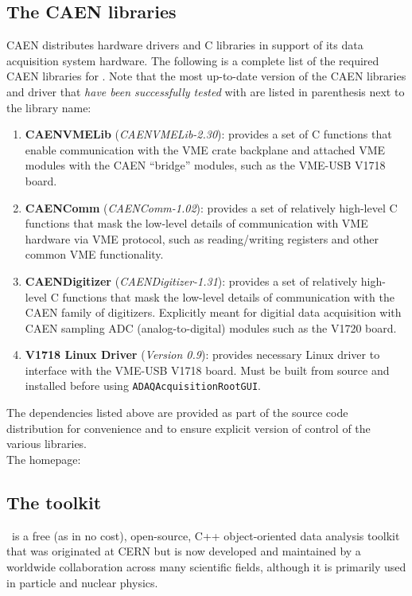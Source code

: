 \subsection{The CAEN libraries}
\label{sec: caendep}
CAEN distributes hardware drivers and C libraries in support of its
data acquisition system hardware. The following is a complete list of
the required CAEN libraries for \ADAQ. Note that the most up-to-date
version of the CAEN libraries and driver that \textit{have been
  successfully tested} with \ADAQ are listed in parenthesis next to the
library name:
\begin{enumerate}
\item{\textbf{CAENVMELib} (\textit{CAENVMELib-2.30}): provides a set
    of C functions that enable communication with the VME crate
    backplane and attached VME modules with the CAEN ``bridge'' modules,
    such as the VME-USB V1718 board.}
\item{\textbf{CAENComm} (\textit{CAENComm-1.02}): provides a set of
    relatively high-level C functions that mask the low-level details
    of communication with VME hardware via VME protocol, such as
    reading/writing registers and other common VME functionality.}
\item{\textbf{CAENDigitizer} (\textit{CAENDigitizer-1.31}): provides a
    set of relatively high-level C functions that mask the low-level
    details of communication with the CAEN family of
    digitizers. Explicitly meant for digitial data acquisition with
    CAEN sampling ADC (analog-to-digital) modules such as the V1720
    board.}
\item{\textbf{V1718 Linux Driver} (\textit{Version 0.9}): provides
  necessary Linux driver to interface with the VME-USB V1718
  board. Must be built from source and installed before using
  \texttt{ADAQAcquisitionRootGUI}.}
\end{enumerate}
The \CAEN dependencies listed above are provided as part of the \ADAQ
source code distribution for convenience and to ensure explicit
version of control of the various libraries.\\

\noindent
The \CAEN homepage: \\

\subsection{The \ROOT toolkit}
\label{sec: rootdep}
\ROOT\ is a free (as in no cost), open-source, C++ object-oriented
data analysis toolkit that was originated at CERN but is now developed
and maintained by a worldwide collaboration across many scientific
fields, although it is primarily used in particle and nuclear physics.

